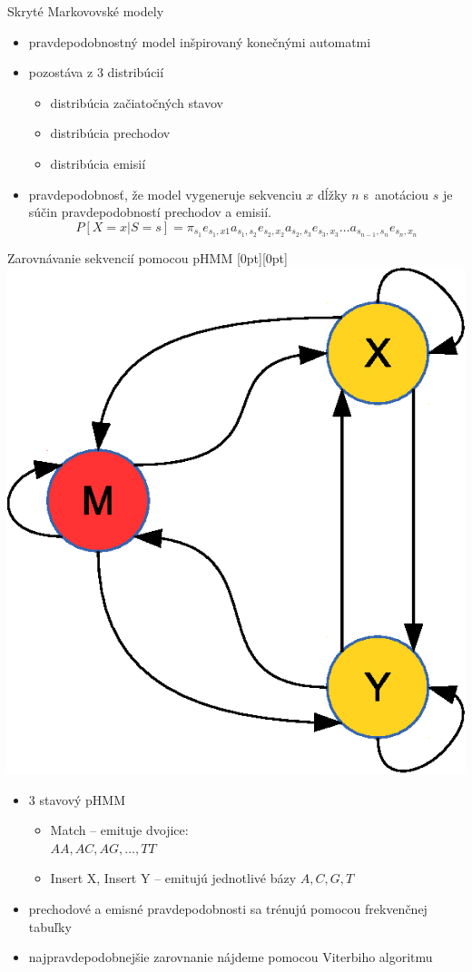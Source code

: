 \documentclass[xcolor=dvipsnames, compress, 12pt]{beamer}
\newcommand{\lenitem}[2][.6\linewidth]{\parbox[t]{#1}{\strut #2\strut}}
\theoremstyle{definition}
\begin{document}
\begin{frame}{Skryté Markovovské modely}
  \begin{itemize}
    \item pravdepodobnostný model inšpirovaný konečnými automatmi
    \item pozostáva z 3 distribúcií
    \begin{itemize}
      \item distribúcia začiatočných stavov
      \item distribúcia prechodov
      \item distribúcia emisií
    \end{itemize}
    \pause
    \item pravdepodobnosť, že model vygeneruje sekvenciu $x$ dĺžky $n$ s~anotáciou $s$ je súčin pravdepodobností prechodov a emisií.
    $$P[X=x | S=s] = \pi_{s_1} e_{s_1,x1} a_{s_1,s_2} e_{s_2,x_2} a_{s_2,s_3} e_{s_3,x_3}\dots a_{s_{n-1},s_n} e_{s_n,x_n}$$
    \cite{skripta, durbin}

  \end{itemize}
\end{frame}

\begin{frame}{Zarovnávanie sekvencií pomocou pHMM}
  \mbox{}\hfill\raisebox{-\height}[0pt][0pt]{
   \includegraphics[width=.30\textwidth]{images/simple_model}
   }
  \vspace*{-\baselineskip}

  \begin{itemize}
    \item \lenitem{3 stavový pHMM}
    \begin{itemize}
      \item \lenitem{Match -- emituje dvojice:\\ $AA, AC, AG,\dots, TT$}
      \item \lenitem{Insert X, Insert Y -- emitujú jednotlivé bázy $A,C,G,T$}
    \end{itemize}
    \item \lenitem{prechodové a emisné pravdepodobnosti sa trénujú pomocou frekvenčnej tabuľky}
    \item najpravdepodobnejšie zarovnanie nájdeme pomocou Viterbiho algoritmu
  \end{itemize}
\end{frame}
\end{document}
